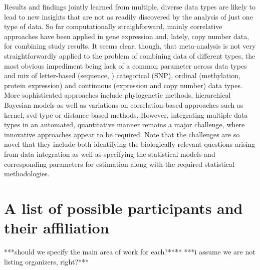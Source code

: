 \documentclass[12pt]{amsart}
\begin{document}
\begin{itemize}
Results and findings jointly learned 
from multiple, diverse data types are likely to lead 
to new insights that are not as readily discovered by the 
analysis of just one type of data. 
So far computationally straighforward, mainly correlative approaches have been applied in 
gene expression  and, lately, copy number data, for combining study results. 
It seems clear, though, that meta-analysis is not very
straightforwardly applied to the problem of 
combining data of different types,
the most obvious impediment being lack of a 
common parameter across data types and mix of letter-based (sequence, ) categorical (SNP), ordinal (methylation, protein expression) and continuous (expression and copy number) data types.
More sophisticated approaches
include phylogenetic methods, hierarchical Bayesian models as well as variations on correlation-based approaches such as kernel, svd-type or
distance-based methods. 
However, integrating multiple data types in an
automated, quantitative manner remains a major challenge,
where innovative approaches appear to be required. Note that the challenges are so novel that they include both identifying the biologically relevant questions arising from data integration as well as specifying the statistical models and corresponding parameters for estimation along with the required statistical methodologies. 

\end{itemize}

\section*{A list of possible participants and their affiliation}

***should we specify the main area of work for each?****
***i assume we are not listing organizers, right?***
\end{document}
